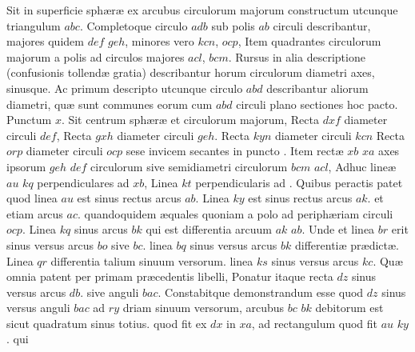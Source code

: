 \documentclass[11pt,a4paper]{article}
\begin{document}
Sit in superficie sphæræ ex arcubus circulorum majorum
constructum utcunque triangulum $abc$. Completoque circulo
$adb$ sub polis $ab$ circuli describantur, majores quidem 
$def$ $geh$, minores vero $kcn$, $ocp$, Item quadrantes circulorum
majorum a polis ad circulos majores $acl$, $bcm$. Rursus in alia
descriptione (confusionis tollendæ gratia) describantur horum circulorum
diametri axes, sinusque. Ac primum descripto utcunque circulo
$abd$ describantur aliorum diametri, quæ sunt communes eorum
cum $abd$ circuli plano sectiones hoc pacto. Punctum $x$. Sit centrum
sphæræ et circulorum majorum, Recta $dxf$ diameter circuli $def$,
Recta $gxh$ diameter circuli $geh$. Recta $kyn$ diameter circuli $kcn$
Recta $orp$ diameter circuli $ocp$ sese invicem secantes in puncto . Item
rectæ $xb$ $xa$ axes ipsorum $geh$ $def$ circulorum sive semidiametri
circulorum $bcm$ $acl$, Adhuc lineæ $au$ $kq$ perpendiculares ad $xb$,
Linea $kt$ perpendicularis ad . Quibus peractis patet quod linea
$au$ est sinus rectus arcus $ab$. Linea $ky$ est sinus rectus arcus $ak$.
et etiam arcus $ac$. quandoquidem æquales quoniam a polo ad
periphæriam circuli $ocp$. Linea $kq$ sinus arcus $bk$ qui est differentia
arcuum $ak$ $ab$. Unde et linea $br$ erit sinus versus arcus $bo$ sive
$bc$. linea $bq$ sinus versus arcus $bk$ differentiæ prædictæ. Linea $qr$
differentia talium sinuum versorum. linea $ks$ sinus versus arcus $kc$. Quæ
omnia patent per primam præcedentis libelli, Ponatur itaque recta $dz$
sinus versus arcus $db$. sive anguli $bac$. Constabitque demonstrandum
esse quod $dz$ sinus versus anguli $bac$ ad $ry$ driam sinuum
versorum, arcubus $bc$ $bk$ debitorum est sicut quadratum sinus totius.
quod fit ex $dx$ in $xa$, ad rectangulum quod fit $au$ $ky$. qui
\end{document}
